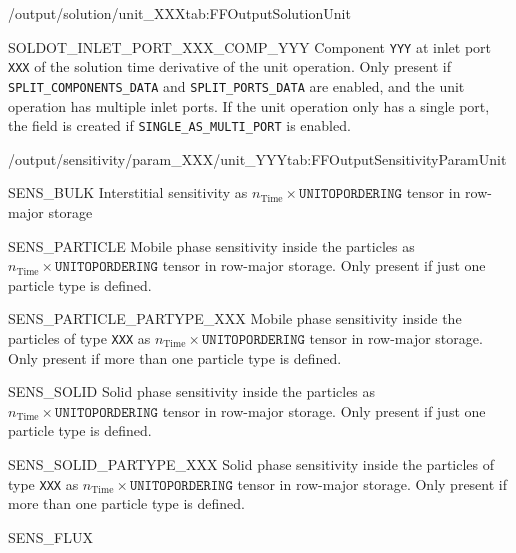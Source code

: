 \begin{groupscope}{/output/solution/unit\_XXX}{tab:FFOutputSolutionUnit}
\begin{dataset}[type=double,unit={\si{\mol\per\cubic\metre\of{IV}\per\second}}]{SOLDOT\_INLET\_PORT\_XXX\_COMP\_YYY}
    Component \texttt{YYY} at inlet port \texttt{XXX} of the solution time derivative of the unit operation.
    Only present if \texttt{SPLIT\_COMPONENTS\_DATA} and \texttt{SPLIT\_PORTS\_DATA} are enabled, and the unit operation has multiple inlet ports.
    If the unit operation only has a single port, the field is created if \texttt{SINGLE\_AS\_MULTI\_PORT} is enabled.
  \end{dataset}
\end{groupscope}

\begin{groupscope}{/output/sensitivity/param\_XXX/unit\_YYY}{tab:FFOutputSensitivityParamUnit}
  \begin{dataset}[type=double,unit={\si{\mol\per\cubic\metre\of{IV}\per\ParamUnit}}]{SENS\_BULK}
    Interstitial sensitivity as $n_{\text{Time}} \times \texttt{UNITOPORDERING}$ tensor in row-major storage
  \end{dataset}
  \begin{dataset}[type=double,unit={\si{\mol\per\cubic\metre\of{MP}\per\ParamUnit}}]{SENS\_PARTICLE}
    Mobile phase sensitivity inside the particles as $n_{\text{Time}} \times \texttt{UNITOPORDERING}$ tensor in row-major storage.
    Only present if just one particle type is defined.
  \end{dataset}
  \begin{dataset}[type=double,unit={\si{\mol\per\cubic\metre\of{MP}\per\ParamUnit}}]{SENS\_PARTICLE\_PARTYPE\_XXX}
    Mobile phase sensitivity inside the particles of type \texttt{XXX} as $n_{\text{Time}} \times \texttt{UNITOPORDERING}$ tensor in row-major storage.
    Only present if more than one particle type is defined.
  \end{dataset}
  \begin{dataset}[type=double,unit={\si{\mol\per\cubic\metre\of{MP}\per\ParamUnit}}]{SENS\_SOLID}
    Solid phase sensitivity inside the particles as $n_{\text{Time}} \times \texttt{UNITOPORDERING}$ tensor in row-major storage.
    Only present if just one particle type is defined.
  \end{dataset}
  \begin{dataset}[type=double,unit={\si{\mol\per\cubic\metre\of{SP}\per\ParamUnit}}]{SENS\_SOLID\_PARTYPE\_XXX}
    Solid phase sensitivity inside the particles of type \texttt{XXX} as $n_{\text{Time}} \times \texttt{UNITOPORDERING}$ tensor in row-major storage.
    Only present if more than one particle type is defined.
  \end{dataset}
  \begin{dataset}[type=double,unit={\si{\mol\per\square\metre\per\second\per\ParamUnit}}]{SENS\_FLUX}

\end{dataset}
\end{groupscope}
